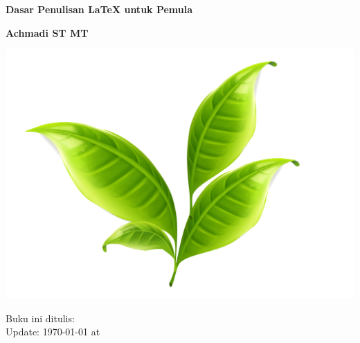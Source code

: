 \documentclass{book} %
\begin{document}

    \frontmatter %

    \begin{titlepage}

        \centering %

        {
            \LARGE %
            \bf %
            Dasar Penulisan \LaTeX{} untuk Pemula
        }

		\bigskip
        {\Large \bf Achmadi ST MT}
        \vfill %

		\includegraphics[width=500pt]{images/leafcover}
		\vfill

		\raggedright
		\noindent Buku ini ditulis:\\ %
		Update: {\today} at \currenttime\\
    \end{titlepage}


	\newpage %
	\tableofcontents %
	\listoffigures %
	\listoftables %

\end{document}
